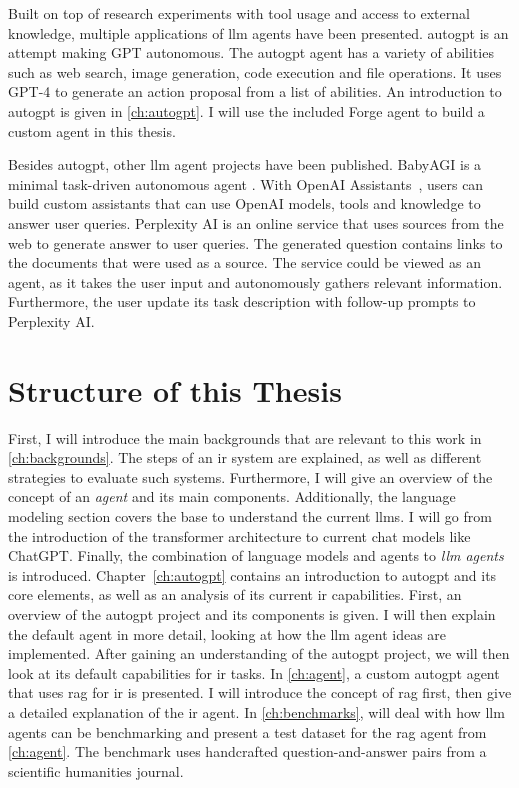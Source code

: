 \documentclass[../main.tex]{subfiles}
\begin{document}
Built on top of research experiments with tool usage and access to external knowledge,
multiple applications of \gls{llm} agents have been presented.
\Gls{autogpt} \cite{SignificantGravitas2023} is an attempt making GPT autonomous.
The \gls{autogpt} agent has a variety of abilities such as web search,
image generation, code execution and file operations.
It uses GPT-4 to generate an action proposal from a list of abilities.
An introduction to \gls{autogpt} is given in \autoref{ch:autogpt}.
I will use the included Forge agent to build a custom agent in this thesis.

Besides \gls{autogpt}, other \gls{llm} agent projects have been published.
BabyAGI is a minimal task-driven autonomous agent \cite{Nakajima2023}.
With OpenAI Assistants~\cite{zotero-195},
users can build custom assistants
that can use OpenAI models, tools and knowledge to answer user queries.
Perplexity AI \cite{zotero-197} is an online service that uses sources from
the web to generate answer to user queries.
The generated question contains links to the documents that were used as a source.
The service could be viewed as an agent, as it takes the user input and autonomously
gathers relevant information.
Furthermore, the user update its task description with follow-up prompts
to Perplexity AI.

\section{Structure of this Thesis}

First, I will introduce the main backgrounds
that are relevant to this work in \autoref{ch:backgrounds}.
The steps of an \gls{ir} system are explained, as well
as different strategies to evaluate such systems.
Furthermore, I will give an overview of the concept of an \emph{agent} and its main components.
Additionally, the language modeling section covers the base
to understand the current \glspl{llm}.
I will go from the introduction of the transformer architecture to current chat models like ChatGPT.
Finally, the combination of language models and agents to \emph{\gls{llm} agents} is introduced.
Chapter~\ref{ch:autogpt} contains an introduction to \gls{autogpt} and its core elements,
as well as an analysis of its current \gls{ir} capabilities.
First, an overview of the \gls{autogpt} project and its components is given.
I will then explain the default agent in more detail,
looking at how the \gls{llm} agent ideas are implemented.
After gaining an understanding of the \gls{autogpt} project,
we will then look at its default capabilities for \gls{ir} tasks.
In \autoref{ch:agent},
a custom \gls{autogpt} agent that uses \gls{rag} for \gls{ir} is presented.
I will introduce the concept of \gls{rag} first, then give a detailed explanation
of the \gls{ir} agent.
In \autoref{ch:benchmarks}, will deal with how \gls{llm} agents can be benchmarking
and present a test dataset for the \gls{rag} agent from \autoref{ch:agent}.
The benchmark uses handcrafted question-and-answer pairs from a scientific humanities journal.
\end{document}
